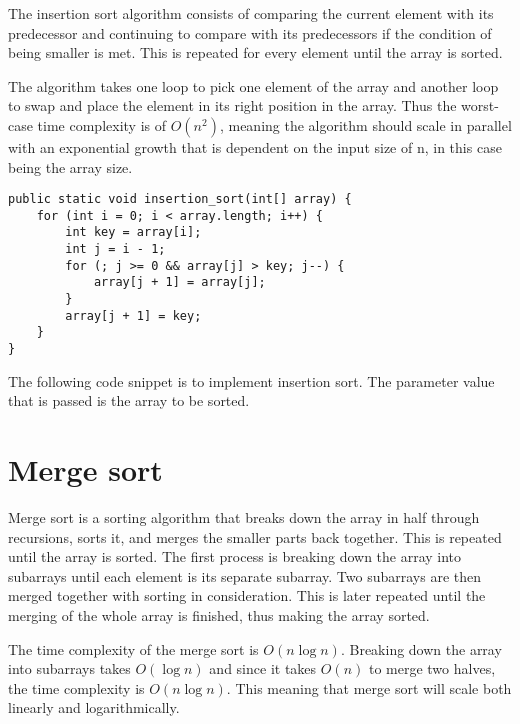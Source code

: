 \documentclass[a4paper,11pt]{article}
\begin{document}
    The insertion sort algorithm consists of comparing the current element with its predecessor and continuing to compare with its predecessors if the condition of being smaller is met. This is repeated for every element until the array is sorted.

    The algorithm takes one loop to pick one element of the array and another loop to swap and place the element in its right position in the array. Thus the worst-case time complexity is of $O(n^2)$, meaning the algorithm should scale in parallel with an exponential growth that is dependent on the input size of n, in this case being the array size.
\begin{verbatim}
public static void insertion_sort(int[] array) {
    for (int i = 0; i < array.length; i++) {
        int key = array[i];
        int j = i - 1;
        for (; j >= 0 && array[j] > key; j--) {                
            array[j + 1] = array[j];            
        }
        array[j + 1] = key;
    }
}
\end{verbatim}
    The following code snippet is to implement insertion sort. The parameter value that is passed is the array to be sorted.
        
\section*{Merge sort}

    Merge sort is a sorting algorithm that breaks down the array in half through recursions, sorts it, and merges the smaller parts back together. This is repeated until the array is sorted. The first process is breaking down the array into subarrays until each element is its separate subarray. Two subarrays are then merged together with sorting in consideration. This is later repeated until the merging of the whole array is finished, thus making the array sorted.

    The time complexity of the merge sort is $O(n \log n)$. Breaking down the array into subarrays takes $O(\log n)$ and since it takes $O(n)$ to merge two halves, the time complexity is $O(n \log n)$. This meaning that merge sort will scale both linearly and logarithmically.
\end{document}
